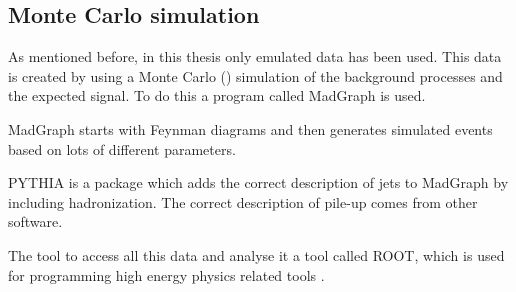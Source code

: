 \subsection{Monte Carlo simulation}
As mentioned before, in this thesis only emulated data has been used. This data is created by using a Monte Carlo (\abbrMC) simulation of the background processes and the expected signal. To do this a program called MadGraph is used.

MadGraph \citep{madgraph} starts with Feynman diagrams and then generates simulated events based on lots of different parameters. 

PYTHIA \citep{Sjostrand:2008} is a package which adds the correct description of jets to MadGraph by including hadronization. The correct description of pile-up comes from other \abbrATLAS software.

The tool to access all this data and analyse it a tool called ROOT, which is used for programming high energy physics related tools \citep{root}.